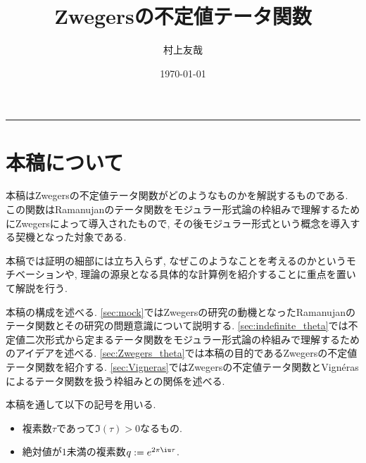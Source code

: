 \documentclass[11pt,b5paper,oneside,lualatex]{ltjsarticle} %
\makeatletter
\numberwithin{equation}{section} %
\renewcommand{\maketitle}{\begin{titlepage}%
		\let\footnotesize\small
		\let\footnoterule\relax
		\parindent \z@
		\reset@font
		\null\vfil
		\begin{center}
			\Huge \@title
		\end{center}
		\par
		\hrule height 4pt
		\par
		\vskip 60\p@
		\begin{flushright}
			\LARGE \@author \par
		\end{flushright}
		\vskip 30\p@
		\begin{flushright}
			{\large \@date}%
		\end{flushright}
		\vskip 30\p@		
		\begin{contentsbox}
			\makeatletter
			\@starttoc{toc}
			\makeatother
		\end{contentsbox}
	\end{titlepage}%
	\setcounter{footnote}{0}%
}
\makeatother
\begin{document}

\title{Zwegersの不定値テータ関数}
\author{村上友哉}
\date{\today}

\maketitle




\section{本稿について} \label{sec:intro}


本稿はZwegersの不定値テータ関数がどのようなものかを解説するものである. 
この関数はRamanujanのテータ関数をモジュラー形式論の枠組みで理解するためにZwegersによって導入されたもので, その後モジュラー形式という概念を導入する契機となった対象である. 

本稿では証明の細部には立ち入らず, なぜこのようなことを考えるのかというモチベーションや, 理論の源泉となる具体的な計算例を紹介することに重点を置いて解説を行う.

本稿の構成を述べる. 
\cref{sec:mock}ではZwegersの研究の動機となったRamanujanのテータ関数とその研究の問題意識について説明する.
\cref{sec:indefinite_theta}では不定値二次形式から定まるテータ関数をモジュラー形式論の枠組みで理解するためのアイデアを述べる. 
\cref{sec:Zwegers_theta}では本稿の目的であるZwegersの不定値テータ関数を紹介する. 
\cref{sec:Vigneras}ではZwegersの不定値テータ関数とVign\'{e}rasによるテータ関数を扱う枠組みとの関係を述べる. 

本稿を通して以下の記号を用いる. 

\begin{symb}{}{}
	\begin{itemize}
		\item 複素数$ \tau $であって$ \Im(\tau) > 0 $なるもの.
		\item 絶対値が$ 1 $未満の複素数$ q := e^{2\pi\iu\tau} $.
	\end{itemize}
\end{symb}
\end{document}
